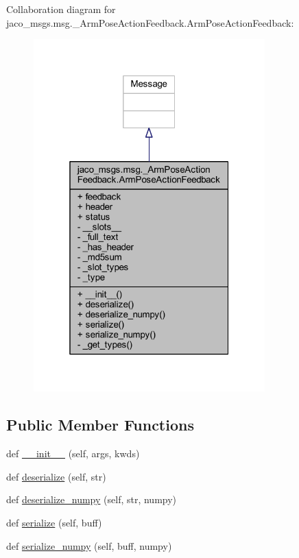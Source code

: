 Collaboration diagram for jaco\+\_\+msgs.\+msg.\+\_\+\+Arm\+Pose\+Action\+Feedback.\+Arm\+Pose\+Action\+Feedback\+:
\nopagebreak
\begin{figure}[H]
\begin{center}
\leavevmode
\includegraphics[width=253pt]{dd/d93/classjaco__msgs_1_1msg_1_1__ArmPoseActionFeedback_1_1ArmPoseActionFeedback__coll__graph}
\end{center}
\end{figure}
\subsection*{Public Member Functions}
\begin{DoxyCompactItemize}
\item 
def \hyperlink{classjaco__msgs_1_1msg_1_1__ArmPoseActionFeedback_1_1ArmPoseActionFeedback_a9347cd26f0f3b9426d1191e9a7fc6043}{\+\_\+\+\_\+init\+\_\+\+\_\+} (self, args, kwds)
\item 
def \hyperlink{classjaco__msgs_1_1msg_1_1__ArmPoseActionFeedback_1_1ArmPoseActionFeedback_a7b867f771f5d087d508d7cf2c8a563f8}{deserialize} (self, str)
\item 
def \hyperlink{classjaco__msgs_1_1msg_1_1__ArmPoseActionFeedback_1_1ArmPoseActionFeedback_ab18aa32ff74667c9f88c38ee0c6be58f}{deserialize\+\_\+numpy} (self, str, numpy)
\item 
def \hyperlink{classjaco__msgs_1_1msg_1_1__ArmPoseActionFeedback_1_1ArmPoseActionFeedback_af6cf4802d5ffce63d8344dd7d0ab0c4b}{serialize} (self, buff)
\item 
def \hyperlink{classjaco__msgs_1_1msg_1_1__ArmPoseActionFeedback_1_1ArmPoseActionFeedback_abd127c90c36317275fa9044dc0191317}{serialize\+\_\+numpy} (self, buff, numpy)
\end{DoxyCompactItemize}
